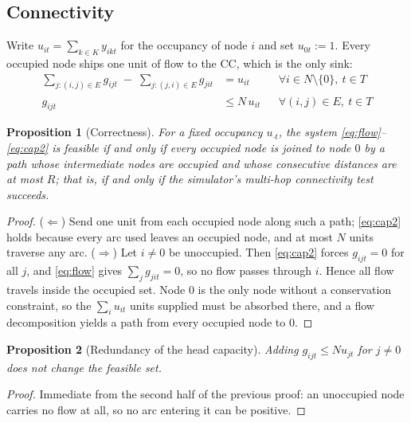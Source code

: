 \documentclass[11pt]{article}
\newtheorem{proposition}{Proposition}
\begin{document}
\subsection{Connectivity}

Write $u_{it} = \sum_{k \in K} y_{ikt}$ for the occupancy of node $i$ and set $u_{0t} := 1$.
Every occupied node ships one unit of flow to the CC, which is the only sink:
\begin{align}
\sum_{j : (i,j) \in E} g_{ijt} \;-\; \sum_{j : (j,i) \in E} g_{jit} &= u_{it}
   && \forall i \in N \setminus \{0\},\ t \in T \label{eq:flow}\\
g_{ijt} &\le N\, u_{it} && \forall (i,j) \in E,\ t \in T \label{eq:cap2}
\end{align}

\begin{proposition}[Correctness]
For a fixed occupancy $u_{\cdot t}$, the system \eqref{eq:flow}--\eqref{eq:cap2} is feasible
if and only if every occupied node is joined to node $0$ by a path whose intermediate nodes
are occupied and whose consecutive distances are at most $R$; that is, if and only if the
simulator's multi-hop connectivity test succeeds.
\end{proposition}

\begin{proof}
($\Leftarrow$) Send one unit from each occupied node along such a path; \eqref{eq:cap2} holds
because every arc used leaves an occupied node, and at most $N$ units traverse any arc.
($\Rightarrow$) Let $i \ne 0$ be unoccupied. Then \eqref{eq:cap2} forces $g_{ijt} = 0$ for all
$j$, and \eqref{eq:flow} gives $\sum_j g_{jit} = 0$, so no flow passes through $i$. Hence all
flow travels inside the occupied set. Node $0$ is the only node without a conservation
constraint, so the $\sum_i u_{it}$ units supplied must be absorbed there, and a flow
decomposition yields a path from every occupied node to $0$.
\end{proof}

\begin{proposition}[Redundancy of the head capacity]
Adding $g_{ijt} \le N u_{jt}$ for $j \ne 0$ does not change the feasible set.
\end{proposition}

\begin{proof}
Immediate from the second half of the previous proof: an unoccupied node carries no flow at
all, so no arc entering it can be positive.
\end{proof}
\end{document}
